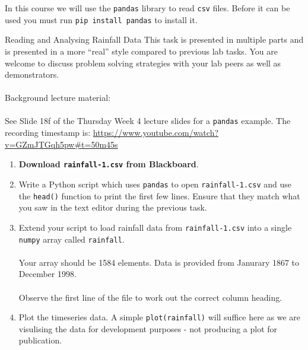 \documentclass{lab}
\begin{document}
In this course we will use the \texttt{pandas} library to read \texttt{csv} files. Before it can be used you must run \texttt{pip install pandas} to install it.

\pagebreak
\begin{task}{Reading and Analysing Rainfall Data}{}
This task is presented in multiple parts and is presented in a more ``real'' style compared to previous lab tasks. You are welcome to discuss problem solving strategies with your lab peers as well as demonstrators.
\\~\\
Background lecture material: \\~\\
See Slide 18f of the Thursday Week 4 lecture slides for a \texttt{pandas} example. The recording timestamp is: \url{https://www.youtube.com/watch?v=GZmJTGqh5pw#t=50m45s}\\
\begin{enumerate}
\item \textbf{Download \texttt{rainfall-1.csv} from Blackboard}.
\item Write a Python script which uses \texttt{pandas} to open \texttt{rainfall-1.csv} and use the \texttt{head()} function to print the first few lines. Ensure that they match what you saw in the text editor during the previous task.
\item Extend your script to load rainfall data from \texttt{rainfall-1.csv} into a single \texttt{numpy} array called \texttt{rainfall}.
\\~\\
Your array should be 1584 elements. Data is provided from Janurary 1867 to December 1998.
\\~\\
Observe the first line of the file to work out the correct column heading.
\item Plot the timeseries data. A simple \texttt{plot(rainfall)} will suffice here as we are visulising the data for development purposes - not producing a plot for publication.


\end{enumerate}
\end{task}
\end{document}
